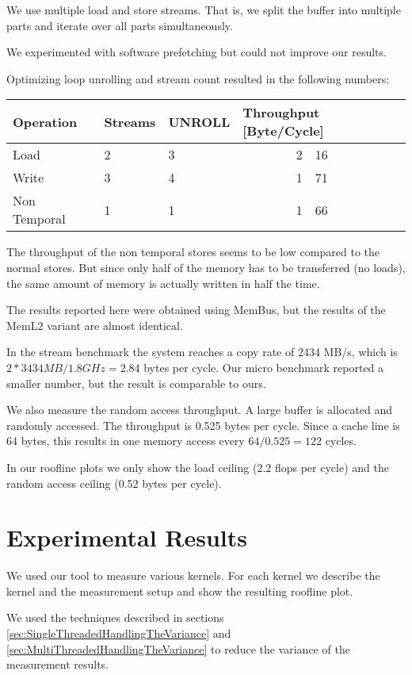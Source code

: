 \documentclass[a4paper,12pt]{report}
\begin{document}
We use multiple load and store streams. That is, we split the buffer
into multiple parts and iterate over all parts simultaneously.

We experimented with software prefetching but could not improve our results. 

Optimizing loop unrolling and stream count resulted in  the following
numbers:

\begin{center}
\begin{tabular}{lllr@{.}l}
\toprule
Operation & Streams & UNROLL &  \multicolumn{2}{l}{Throughput
[Byte/Cycle]} \\
\midrule
Load  &  2 & 3 & 2&16\\
Write &  3 & 4 & 1&71\\
Non Temporal & 1 & 1 & 1&66\\
\bottomrule
\end{tabular}
\end{center}

The throughput of the non temporal stores seems to be low compared to the
normal stores. But since only half of the memory has to be transferred (no
loads), the same amount of memory is actually written in half the time.

The results reported here were obtained using MemBus, but the results of the
MemL2 variant are almost identical.
 
In the stream benchmark \cite{stream} the system reaches a copy rate of 2434
MB/s, which is $2*3434MB/1.8GHz=2.84$ bytes per cycle. Our micro benchmark
reported a smaller number, but the result is comparable to ours.

We also measure the random access throughput. A large buffer is allocated and
randomly accessed. The throughput is 0.525 bytes per cycle. Since a cache line is
64 bytes, this results in one memory access every $64/0.525=122$ cycles.

In our roofline plots we only show the load ceiling (2.2 flops per cycle) and
the random access ceiling (0.52 bytes per cycle).

\chapter{Experimental Results}
We used our tool to measure various kernels. For each kernel we describe the
kernel and the measurement setup and show the resulting roofline plot.

We used the techniques described in sections
\ref{sec:SingleThreadedHandlingTheVariance} and
\ref{sec:MultiThreadedHandlingTheVariance} to reduce the variance of the
measurement results. 
\end{document}
